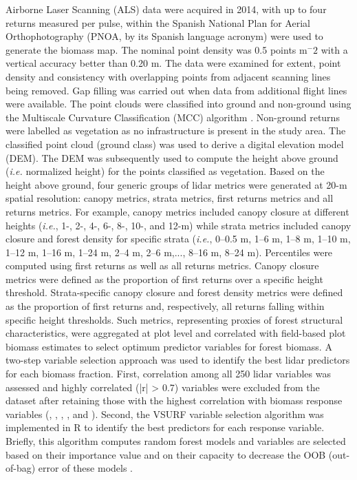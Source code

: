 Airborne Laser Scanning (ALS) data were acquired in 2014, with up to four returns measured per pulse, within the Spanish National Plan for Aerial Orthophotography (PNOA, by its Spanish language acronym) were used to generate the biomass map. The nominal point density was 0.5 points m$^-2$ with a vertical accuracy better than 0.20 m. 
The data were examined for extent, point density and consistency with overlapping points from adjacent scanning lines being removed. Gap filling was carried out when data from additional flight lines were available. The point clouds were classified into ground and non-ground using the Multiscale Curvature Classification (MCC) algorithm \autocite{EvansHudak2007MultiscaleCurvature}. Non-ground returns were labelled as vegetation as no infrastructure is present in the study area. The classified point cloud (ground class) was used to derive a digital elevation model (DEM). The DEM was subsequently used to compute the height above ground (\emph{i.e.} normalized height) for the points classified as vegetation. Based on the height above ground, four generic groups of lidar metrics were generated at 20-m spatial resolution: canopy metrics, strata metrics, first returns metrics and all returns metrics. For example, canopy metrics included canopy closure at different heights (\emph{i.e.}, 1-, 2-, 4-, 6-, 8-, 10-, and 12-m) while strata metrics included canopy closure and forest density for specific strata (\emph{i.e.}, 0–0.5 m, 1–6 m, 1–8 m, 1–10 m, 1–12 m, 1–16 m, 1–24 m, 2–4 m, 2–6 m,..., 8–16 m, 8–24 m). Percentiles were computed using first returns as well as all returns metrics. Canopy closure metrics were defined as the proportion of first returns over a specific height threshold. Strata-specific canopy closure and forest density metrics were defined as the proportion of first returns and, respectively, all returns falling within specific height thresholds. Such metrics, representing proxies of forest structural characteristics, were aggregated at plot level and correlated with field-based plot biomass estimates to select optimum predictor variables for forest biomass.
A two-step variable selection approach was used to identify the best lidar predictors for each biomass fraction.  First, correlation among all 250 lidar variables was assessed and highly correlated (|r| > 0.7) variables were excluded from the dataset after retaining those with the highest correlation with biomass response variables (\ws, \wb, \wbs, \wro, and \wt). Second, the VSURF variable selection algorithm was implemented in R \autocite{Genueretal2019VSURFVariable} to identify the best predictors for each response variable. Briefly, this algorithm computes random forest models and variables are selected based on their importance value and on their capacity to decrease the OOB (out-of-bag) error of these models \autocite[more details can be found in VSURF package description][]{Genueretal2019VSURFVariable}. 

